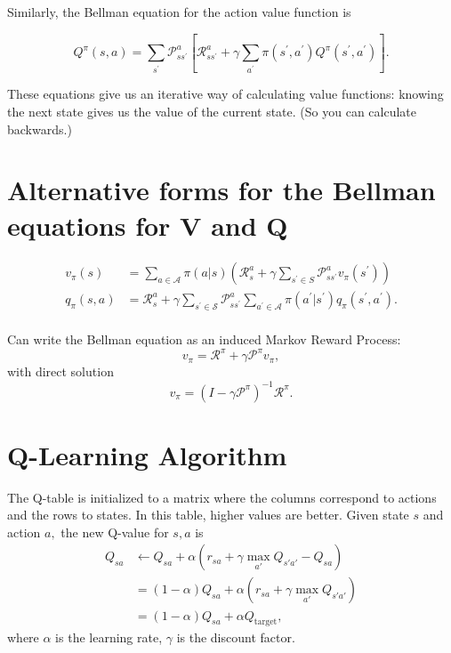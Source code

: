 \documentclass[12pt]{article}
\theoremstyle{plain}
\theoremstyle{definition}
\theoremstyle{remark}
\begin{document}
Similarly, the Bellman equation for the action value function is

\[
Q ^ { \pi } ( s , a ) = \sum _ { s ^ { \prime } } \mathcal { P } _ { s s ^ { \prime } } ^ { a } \left[ \mathcal { R } _ { s s ^ { \prime } } ^ { a } + \gamma \sum _ { a ^ { \prime } } \pi \left( s ^ { \prime } , a ^ { \prime } \right) Q ^ { \pi } \left( s ^ { \prime } , a ^ { \prime } \right) \right].
\]

These equations give us an iterative way of calculating value functions: knowing the next state gives us the value of the current state. (So you can calculate backwards.)

\section{Alternative forms for the Bellman equations for V and Q}

\begin{align*}
v _ { \pi } ( s ) &= \sum _ { a \in \mathcal { A } } \pi ( a | s ) \left( \mathcal { R } _ { s } ^ { a } + \gamma \sum _ { s ^ { \prime } \in S } \mathcal { P } _ { s s ^ { \prime } } ^ { a } v _ { \pi } \left( s ^ { \prime } \right) \right) \\
q _ { \pi } ( s , a ) &= \mathcal { R } _ { s } ^ { a } + \gamma \sum _ { s ^ { \prime } \in \mathcal { S } } \mathcal { P } _ { s s ^ { \prime } } ^ { a } \sum _ { a ^ { \prime } \in \mathcal { A } } \pi \left( a ^ { \prime } | s ^ { \prime } \right) q _ { \pi } \left( s ^ { \prime } , a ^ { \prime } \right). \\
\end{align*}

Can write the Bellman equation as an induced Markov Reward Process:
\[
v _ { \pi } = \mathcal { R } ^ { \pi } + \gamma \mathcal { P } ^ { \pi } v _ { \pi },
\]
with direct solution
\[
v _ { \pi } = \left( I - \gamma \mathcal { P } ^ { \pi } \right) ^ { - 1 } \mathcal { R } ^ { \pi }.
\]


\section{Q-Learning Algorithm}

The Q-table is initialized to a matrix where the columns correspond to actions
and the rows to states. In this table, higher values are better. Given state \(
s \) and action \( a, \) the new Q-value for \( s,  a \) is
\begin{align*}
Q_{sa} &\gets Q_{sa} + \alpha (r_{sa} + \gamma \max_{a'} Q_{s'a'} - Q_{sa}) \\
&= (1 - \alpha) Q_{sa} + \alpha (r_{sa} + \gamma \max_{a'} Q_{s'a'}) \\
&= (1 - \alpha) Q_{sa} + \alpha Q_{\text{target}},
\end{align*}
where \( \alpha \) is the learning rate, \( \gamma \) is the discount factor.
\end{document}
